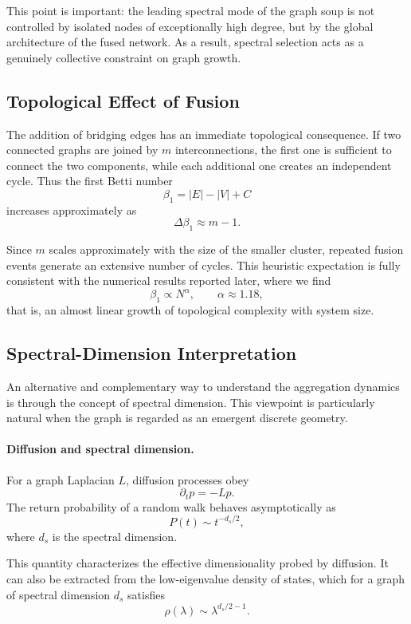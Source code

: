 \documentclass[11pt]{article}
\begin{document}
This point is important: the leading spectral mode of the graph soup is not controlled by isolated nodes of exceptionally high degree, but by the global architecture of the fused network.
As a result, spectral selection acts as a genuinely collective constraint on graph growth.

\subsection{Topological Effect of Fusion}

The addition of bridging edges has an immediate topological consequence.
If two connected graphs are joined by $m$ interconnections, the first one is sufficient to connect the two components, while each additional one creates an independent cycle.
Thus the first Betti number
\[
\beta_1 = |E|-|V|+C
\]
increases approximately as
\[
\Delta \beta_1 \approx m-1.
\]

Since $m$ scales approximately with the size of the smaller cluster, repeated fusion events generate an extensive number of cycles.
This heuristic expectation is fully consistent with the numerical results reported later, where we find
\[
\beta_1 \propto N^\alpha,
\qquad \alpha \approx 1.18,
\]
that is, an almost linear growth of topological complexity with system size.

\subsection{Spectral-Dimension Interpretation}

An alternative and complementary way to understand the aggregation dynamics is through the concept of spectral dimension.
This viewpoint is particularly natural when the graph is regarded as an emergent discrete geometry.

\paragraph{Diffusion and spectral dimension.}

For a graph Laplacian $L$, diffusion processes obey
\[
\partial_t p = -Lp.
\]
The return probability of a random walk behaves asymptotically as
\[
P(t)\sim t^{-d_s/2},
\]
where $d_s$ is the spectral dimension.

This quantity characterizes the effective dimensionality probed by diffusion.
It can also be extracted from the low-eigenvalue density of states, which for a graph of spectral dimension $d_s$ satisfies
\[
\rho(\lambda)\sim \lambda^{d_s/2-1}.
\]
\end{document}
